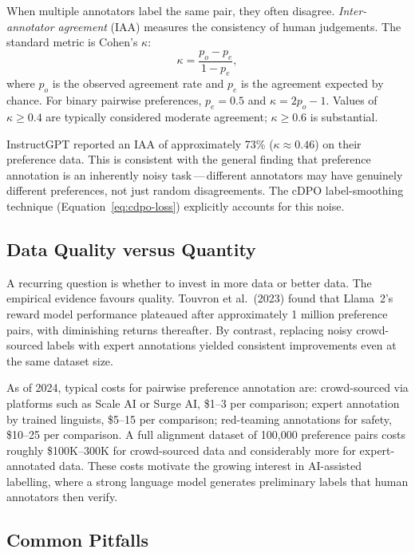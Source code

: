 When multiple annotators label the same pair, they often disagree. \emph{Inter-annotator agreement} (IAA) measures the consistency of human judgements. The standard metric is Cohen's $\kappa$:
\[
\kappa = \frac{p_o - p_e}{1 - p_e},
\]
where $p_o$ is the observed agreement rate and $p_e$ is the agreement expected by chance. For binary pairwise preferences, $p_e = 0.5$ and $\kappa = 2p_o - 1$. Values of $\kappa \geq 0.4$ are typically considered moderate agreement; $\kappa \geq 0.6$ is substantial.

InstructGPT reported an IAA of approximately 73\% ($\kappa \approx 0.46$) on their preference data. This is consistent with the general finding that preference annotation is an inherently noisy task\,---\,different annotators may have genuinely different preferences, not just random disagreements. The cDPO label-smoothing technique (Equation~\eqref{eq:cdpo-loss}) explicitly accounts for this noise.

\subsection{Data Quality versus Quantity}
\label{sec:data-quality-quantity}

A recurring question is whether to invest in more data or better data. The empirical evidence favours quality. Touvron et al.\ (2023) found that Llama~2's reward model performance plateaued after approximately 1 million preference pairs, with diminishing returns thereafter. By contrast, replacing noisy crowd-sourced labels with expert annotations yielded consistent improvements even at the same dataset size.

\begin{remark}
\label{rem:data-costs}
As of 2024, typical costs for pairwise preference annotation are: crowd-sourced via platforms such as Scale AI or Surge AI, \$1--3 per comparison; expert annotation by trained linguists, \$5--15 per comparison; red-teaming annotations for safety, \$10--25 per comparison. A full alignment dataset of 100{,}000 preference pairs costs roughly \$100K--300K for crowd-sourced data and considerably more for expert-annotated data. These costs motivate the growing interest in AI-assisted labelling, where a strong language model generates preliminary labels that human annotators then verify.
\end{remark}

\subsection{Common Pitfalls}

